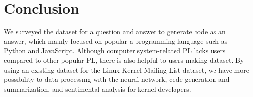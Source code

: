 \section{Conclusion}
We surveyed the dataset for a question and answer to generate code as an answer,
which mainly focused on popular
a programming language such as Python and JavaScript. Although computer
system-related PL lacks users compared to other popular PL, there is also
helpful to users making dataset. By using an existing dataset for the Linux
Kernel Mailing List dataset, we have more possibility to data processing
with the neural network, code generation and summarization, and sentimental
analysis for kernel developers.

